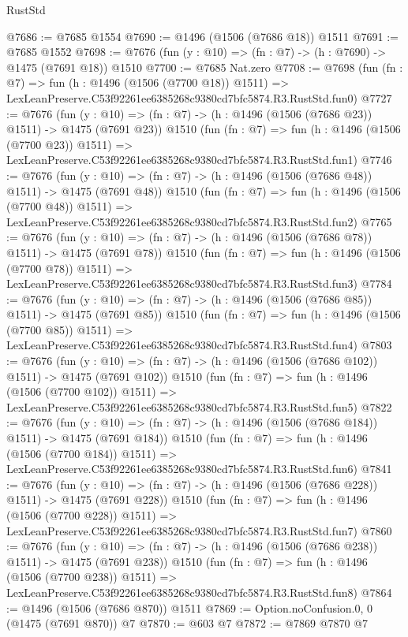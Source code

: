 \begin{lexlean}{RustStd}
\begin{coremodule}
@7686 := @7685 @1554
@7690 := @1496 (@1506 (@7686 @18)) @1511
@7691 := @7685 @1552
@7698 := @7676 (fun (y : @10) => (fn : @7) -> (h : @7690) -> @1475 (@7691 @18)) @1510
@7700 := @7685 Nat.zero
@7708 := @7698
    (fun (fn : @7) =>
    fun (h : @1496 (@1506 (@7700 @18)) @1511) =>
    LexLeanPreserve.C53f92261ee6385268c9380cd7bfc5874.R3.RustStd.fun0)
@7727 := @7676
    (fun (y : @10) => (fn : @7) -> (h : @1496 (@1506 (@7686 @23)) @1511) -> @1475 (@7691 @23))
    @1510
    (fun (fn : @7) =>
    fun (h : @1496 (@1506 (@7700 @23)) @1511) =>
    LexLeanPreserve.C53f92261ee6385268c9380cd7bfc5874.R3.RustStd.fun1)
@7746 := @7676
    (fun (y : @10) => (fn : @7) -> (h : @1496 (@1506 (@7686 @48)) @1511) -> @1475 (@7691 @48))
    @1510
    (fun (fn : @7) =>
    fun (h : @1496 (@1506 (@7700 @48)) @1511) =>
    LexLeanPreserve.C53f92261ee6385268c9380cd7bfc5874.R3.RustStd.fun2)
@7765 := @7676
    (fun (y : @10) => (fn : @7) -> (h : @1496 (@1506 (@7686 @78)) @1511) -> @1475 (@7691 @78))
    @1510
    (fun (fn : @7) =>
    fun (h : @1496 (@1506 (@7700 @78)) @1511) =>
    LexLeanPreserve.C53f92261ee6385268c9380cd7bfc5874.R3.RustStd.fun3)
@7784 := @7676
    (fun (y : @10) => (fn : @7) -> (h : @1496 (@1506 (@7686 @85)) @1511) -> @1475 (@7691 @85))
    @1510
    (fun (fn : @7) =>
    fun (h : @1496 (@1506 (@7700 @85)) @1511) =>
    LexLeanPreserve.C53f92261ee6385268c9380cd7bfc5874.R3.RustStd.fun4)
@7803 := @7676
    (fun (y : @10) => (fn : @7) -> (h : @1496 (@1506 (@7686 @102)) @1511) -> @1475 (@7691 @102))
    @1510
    (fun (fn : @7) =>
    fun (h : @1496 (@1506 (@7700 @102)) @1511) =>
    LexLeanPreserve.C53f92261ee6385268c9380cd7bfc5874.R3.RustStd.fun5)
@7822 := @7676
    (fun (y : @10) => (fn : @7) -> (h : @1496 (@1506 (@7686 @184)) @1511) -> @1475 (@7691 @184))
    @1510
    (fun (fn : @7) =>
    fun (h : @1496 (@1506 (@7700 @184)) @1511) =>
    LexLeanPreserve.C53f92261ee6385268c9380cd7bfc5874.R3.RustStd.fun6)
@7841 := @7676
    (fun (y : @10) => (fn : @7) -> (h : @1496 (@1506 (@7686 @228)) @1511) -> @1475 (@7691 @228))
    @1510
    (fun (fn : @7) =>
    fun (h : @1496 (@1506 (@7700 @228)) @1511) =>
    LexLeanPreserve.C53f92261ee6385268c9380cd7bfc5874.R3.RustStd.fun7)
@7860 := @7676
    (fun (y : @10) => (fn : @7) -> (h : @1496 (@1506 (@7686 @238)) @1511) -> @1475 (@7691 @238))
    @1510
    (fun (fn : @7) =>
    fun (h : @1496 (@1506 (@7700 @238)) @1511) =>
    LexLeanPreserve.C53f92261ee6385268c9380cd7bfc5874.R3.RustStd.fun8)
@7864 := @1496 (@1506 (@7686 @870)) @1511
@7869 := Option.noConfusion.{0, 0} (@1475 (@7691 @870)) @7
@7870 := @603 @7
@7872 := @7869 @7870 @7

\end{coremodule}
\end{lexlean}
